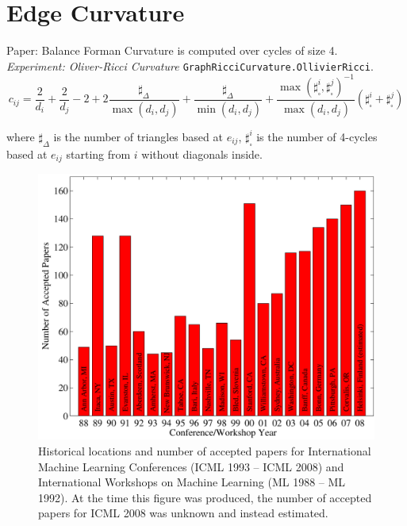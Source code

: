 \documentclass{article}
\theoremstyle{plain}
\theoremstyle{definition}
\theoremstyle{remark}
\begin{document}
\section{Edge Curvature}
\label{app:curvature}

Paper: Balance Forman Curvature \cite{topping2022understandingoversquashingbottlenecksgraphs} is computed over cycles of size 4.\\
    \emph{Experiment: Oliver-Ricci Curvature \cite{ni2015riccicurvatureinternettopology}} {\scriptsize
    \texttt{GraphRicciCurvature.OllivierRicci}.
    }\\
    $$c_{ij}= \frac{2}{d_i} + \frac{2}{d_j} - 2 + 2 \frac{\sharp_{\Delta}}{\max(d_i, d_j)} + 
            \frac{\sharp_{\Delta}}{\min(d_i, d_j)} + 
            \frac{\max(\sharp_{\square}^i,\sharp_{\square}^j)^{-1}}{\max(d_i, d_j)}
            (\sharp_{\square}^i + \sharp_{\square}^j)
    $$

    where $\sharp_{\Delta}$ is the number of triangles based at $e_{ij}$, 
    $\sharp_{\square}^i$ is the number of 4-cycles based at $e_{ij}$ starting from $i$
    without diagonals inside.


    
\begin{figure}[ht]
    \vskip 0.2in
    \begin{center}
    \centerline{\includegraphics[width=\columnwidth]{icml_numpapers}}
    \caption{Historical locations and number of accepted papers for International
    Machine Learning Conferences (ICML 1993 -- ICML 2008) and International
    Workshops on Machine Learning (ML 1988 -- ML 1992). At the time this figure was
    produced, the number of accepted papers for ICML 2008 was unknown and instead
    estimated.}
    \label{icml-historical}
    \end{center}
    \vskip -0.2in
    \end{figure}
    
\end{document}
